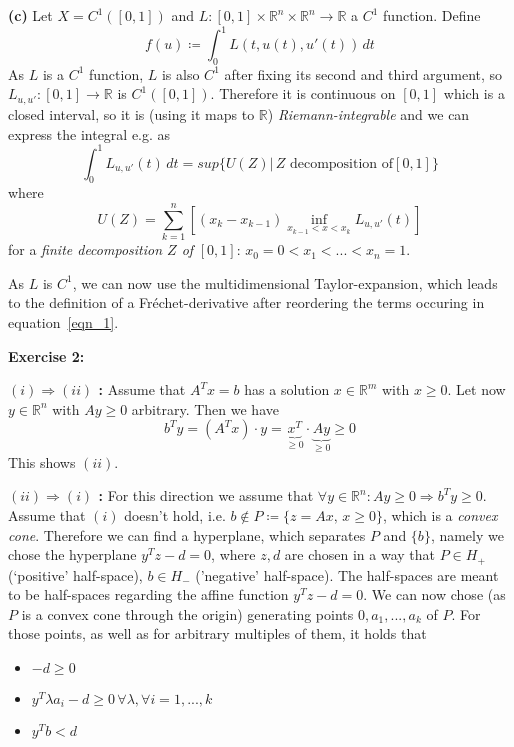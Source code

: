 \documentclass[a4paper]{amsart}
\begin{document}
	\textbf{(c) } Let $X = C^1([0,1])$ and $L:[0,1]\times\mathbb{R}^n\times\mathbb{R}^n\to\mathbb{R}$ a $C^1$ function. Define
	\[
		f(u) \coloneqq \int_0^1 L(t,u(t),u'(t))\,dt
	\]
	As $L$ is a $C^1$ function, $L$ is also $C^1$ after fixing its second and third argument, so $L_{u,u'}:[0,1]\to\mathbb{R}$ is $C^1([0,1])$. Therefore it is continuous on $[0,1]$ which is a closed interval, so it is (using it maps to $\mathbb{R}$) \emph{Riemann-integrable} and we can express the integral e.g. as
	\begin{equation}\label{eqn_1}
		\int_0^1 L_{u,u'}(t)\,dt = sup\{U(Z)\vert \, Z\text{ decomposition of} [0,1]\}
	\end{equation}
	where 
	\[
		U(Z) = \sum_{k=1}^n \left[ (x_k-x_{k-1})\inf_{x_{k-1}<x<x_k} L_{u,u'}(t) \right]
	\]
	for a \emph{finite decomposition $Z$ of} $[0,1]$: $x_0=0 < x_1 < ... < x_n = 1$. \par
	As $L$ is $C^1$, we can now use the multidimensional Taylor-expansion, which leads to the definition of a Fréchet-derivative after reordering the terms occuring in equation~\ref{eqn_1}.\par\par

	\textbf{Exercise 2: } \par
	\textbf{$(i)\Rightarrow(ii)$ :} Assume that $A^Tx=b$ has a solution $x\in\mathbb{R}^m$ with $x\geq 0$. Let now $y\in\mathbb{R}^n$ with $Ay\geq 0$ arbitrary. Then we have
	\[
		b^T y = (A^Tx)\cdot y = \underbrace{x^T}_{\geq 0}\cdot\underbrace{Ay}_{\geq 0} \geq 0
	\] 
	This shows $(ii)$.\par\par
	\textbf{$(ii)\Rightarrow(i)$ :} For this direction we assume that $\forall y\in\mathbb{R}^n: Ay\geq 0 \Rightarrow b^T y\geq 0$. Assume that $(i)$ doesn't hold, i.e. $b\not\in P\coloneqq\{z = Ax,\,x\geq 0\}$, which is a \emph{convex cone}. Therefore we can find a hyperplane, which separates $P$ and $\{b\}$, namely we chose the hyperplane $y^Tz - d = 0$, where $z, d$ are chosen in a way that $P\in H_+$ (`positive' half-space), $b\in H_-$ ('negative' half-space). The half-spaces are meant to be half-spaces regarding the affine function $y^Tz-d = 0$. We can now chose (as $P$ is a convex cone through the origin) generating points $0, a_1, ...,a_k$ of $P$. For those points, as well as for arbitrary multiples of them, it holds that
	\begin{itemize}
		\item $-d\geq 0$
		\item $y^T\lambda a_i - d\geq 0\,\forall \lambda,\forall i=1,...,k$
		\item $y^T b < d$
	\end{itemize}
\end{document}
